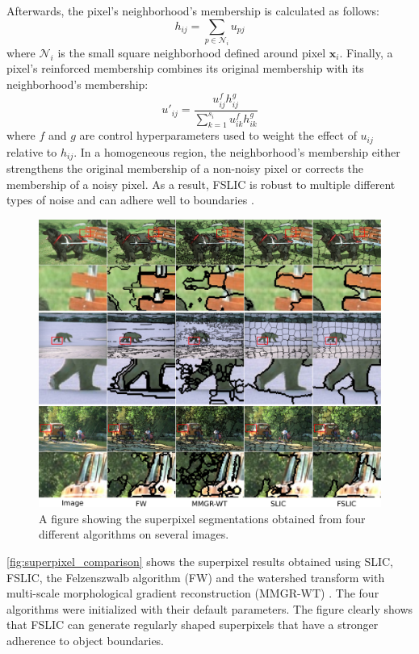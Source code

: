 Afterwards, the pixel's neighborhood's membership is calculated as follows:
\begin{equation}
    h_{ij} = \sum_{p \in \mathcal{N}_i}{u_{pj}}
\end{equation}
where $\mathcal{N}_i$ is the small square neighborhood defined around pixel $\mathbf{x}_i$. Finally, a pixel's reinforced membership combines its original membership with its neighborhood's membership:
\begin{equation}
    u'_{ij} = \frac{u_{ij}^{f}h_{ij}^{g}}{\sum_{k=1}^{s_i}{u_{ik}^{f}h_{ik}^{g}}}
\label{eq:fslic_memberships}
\end{equation}
where $f$ and $g$ are control hyperparameters used to weight the effect of $u_{ij}$ relative to $h_{ij}$. In a homogeneous region, the neighborhood's membership either strengthens the original membership of a non-noisy pixel or corrects the membership of a noisy pixel. As a result, FSLIC is robust to multiple different types of noise and can adhere well to boundaries \parencite{wu2019improved}.

\begin{figure}[t]
    \centering
    \includegraphics[width=\textwidth]{figures/superpixel_comparison.pdf}
    \caption{A figure showing the superpixel segmentations obtained from four different algorithms on several images.}
    \label{fig:superpixel_comparison}
\end{figure}

\autoref{fig:superpixel_comparison} shows the superpixel results obtained using SLIC, FSLIC, the Felzenszwalb algorithm (FW) and the watershed transform with multi-scale morphological gradient reconstruction (MMGR-WT) \parencite{lei2018superpixel}. The four algorithms were initialized with their default parameters. The figure clearly shows that FSLIC can generate regularly shaped superpixels that have a stronger adherence to object boundaries.


